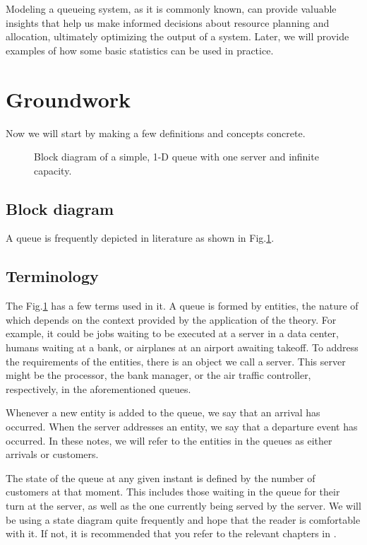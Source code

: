 \documentclass[11pt, a4paper]{report}
\begin{document}
Modeling a queueing system, as it is commonly known, can provide valuable insights that help us make informed decisions about resource planning and allocation, ultimately optimizing the output of a system. Later, we will provide examples of how some basic statistics can be used in practice.

\section{Groundwork}
Now we will start by making a few definitions and concepts concrete. 

\begin{figure}
    \centering
    
    \caption{Block diagram of a simple, 1-D queue with one server and infinite capacity.}
    \label{fig:simpleQblk}
\end{figure}

\subsection{Block diagram}
A queue is frequently depicted in literature as shown in Fig.\ref{fig:simpleQblk}.

\subsection{Terminology}
The Fig.\ref{fig:simpleQblk} has a few terms used in it.  A queue is formed by entities, the nature of which depends on the context provided by the application of the theory. For example, it could be jobs waiting to be executed at a server in a data center, humans waiting at a bank, or airplanes at an airport awaiting takeoff. To address the requirements of the entities, there is an object we call a server. This server might be the processor, the bank manager, or the air traffic controller, respectively, in the aforementioned queues.

Whenever a new entity is added to the queue, we say that an arrival has occurred. When the server addresses an entity, we say that a departure event has occurred. In these notes, we will refer to the entities in the queues as either arrivals or customers.

The state of the queue at any given instant is defined by the number of customers at that moment. This includes those waiting in the queue for their turn at the server, as well as the one currently being served by the server. We will be using a state diagram quite frequently and hope that the reader is comfortable with it. If not, it is recommended that you refer to the relevant chapters in \cite{pishro2014introduction}.
\end{document}
